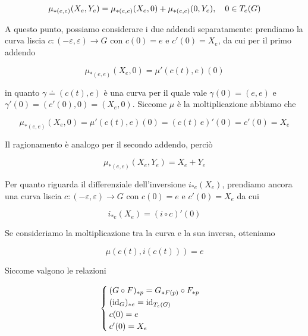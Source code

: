 \begin{equation}
	\mu_{*(e,e)}(X_{e},Y_{e}) = \mu_{*(e,e)}(X_{e},0) + \mu_{*(e,e)}(0,Y_{e}) \qcomma 0 \in T_{e}(G)
\end{equation}

A questo punto, possiamo considerare i due addendi separatamente: prendiamo la curva liscia $ c : (-\varepsilon,\varepsilon) \to G $ con $ c(0)=e $ e $ c'(0) = X_{e} $, da cui per il primo addendo

\begin{equation}
	\mu_{*(e,e)}(X_{e},0) = \mu'(c(t),e)(0)
\end{equation}

in quanto $ \gamma \doteq (c(t),e) $ è una curva per il quale vale $ \gamma(0) = (e,e) $ e $ \gamma'(0) = (c'(0),0) = (X_{e},0) $. Siccome  $ \mu $ è la moltiplicazione abbiamo che

\begin{equation}
	\mu_{*(e,e)}(X_{e},0) = \mu'(c(t),e)(0) %
	= (c(t) \, e)'(0) %
	= c'(0) %
	= X_{e}
\end{equation}

Il ragionamento è analogo per il secondo addendo, perciò

\begin{equation}
	\mu_{*(e,e)}(X_{e},Y_{e}) = X_{e} + Y_{e}
\end{equation}

Per quanto riguarda il differenziale dell'inversione $ i_{*e}(X_{e}) $, prendiamo ancora una curva liscia $ c : (-\varepsilon,\varepsilon) \to G $ con $ c(0)=e $ e $ c'(0) = X_{e} $ da cui

\begin{equation}
	i_{*e}(X_{e}) = (i \circ c)'(0)
\end{equation}

Se consideriamo la moltiplicazione tra la curva e la sua inversa, otteniamo

\begin{equation}
	\mu(c(t),i(c(t))) = e
\end{equation}

Siccome valgono le relazioni

\begin{equation}
	\begin{cases}
		(G \circ F)_{*p} = G_{*F(p)} \circ F_{*p}\\
		(\operatorname{id}_{G})_{*e} = \operatorname{id}_{T_{e}(G)}\\
		c(0) = e\\
		c'(0) = X_{e}
	\end{cases}
\end{equation}

